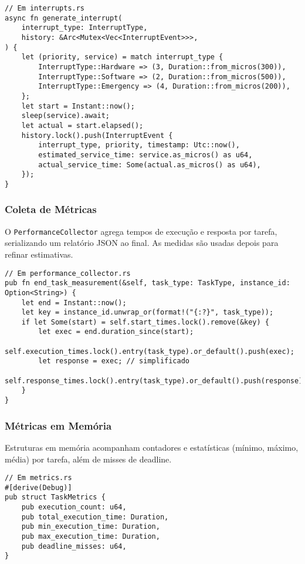 \documentclass[conference]{IEEEtran}
\begin{document}
\begin{lstlisting}[caption={Geração de interrupções com atrasos simulados.}, label={lst:interrupts_alt}]
// Em interrupts.rs
async fn generate_interrupt(
    interrupt_type: InterruptType,
    history: &Arc<Mutex<Vec<InterruptEvent>>>,
) {
    let (priority, service) = match interrupt_type {
        InterruptType::Hardware => (3, Duration::from_micros(300)),
        InterruptType::Software => (2, Duration::from_micros(500)),
        InterruptType::Emergency => (4, Duration::from_micros(200)),
    };
    let start = Instant::now();
    sleep(service).await;
    let actual = start.elapsed();
    history.lock().push(InterruptEvent {
        interrupt_type, priority, timestamp: Utc::now(),
        estimated_service_time: service.as_micros() as u64,
        actual_service_time: Some(actual.as_micros() as u64),
    });
}
\end{lstlisting}

\subsubsection{Coleta de Métricas}
O \texttt{PerformanceCollector} agrega tempos de execução e resposta por tarefa, serializando um relatório JSON ao final. As medidas são usadas depois para refinar estimativas.

\begin{lstlisting}[caption={Encerrando a medição de execução.}, label={lst:perf_collector_alt}]
// Em performance_collector.rs
pub fn end_task_measurement(&self, task_type: TaskType, instance_id: Option<String>) {
    let end = Instant::now();
    let key = instance_id.unwrap_or(format!("{:?}", task_type));
    if let Some(start) = self.start_times.lock().remove(&key) {
        let exec = end.duration_since(start);
        self.execution_times.lock().entry(task_type).or_default().push(exec);
        let response = exec; // simplificado
        self.response_times.lock().entry(task_type).or_default().push(response);
    }
}
\end{lstlisting}

\subsubsection{Métricas em Memória}
Estruturas em memória acompanham contadores e estatísticas (mínimo, máximo, média) por tarefa, além de misses de deadline.

\begin{lstlisting}[caption={Estrutura de métricas resumida.}, label={lst:metrics_alt}]
// Em metrics.rs
#[derive(Debug)]
pub struct TaskMetrics {
    pub execution_count: u64,
    pub total_execution_time: Duration,
    pub min_execution_time: Duration,
    pub max_execution_time: Duration,
    pub deadline_misses: u64,
}
\end{lstlisting}
\end{document}
